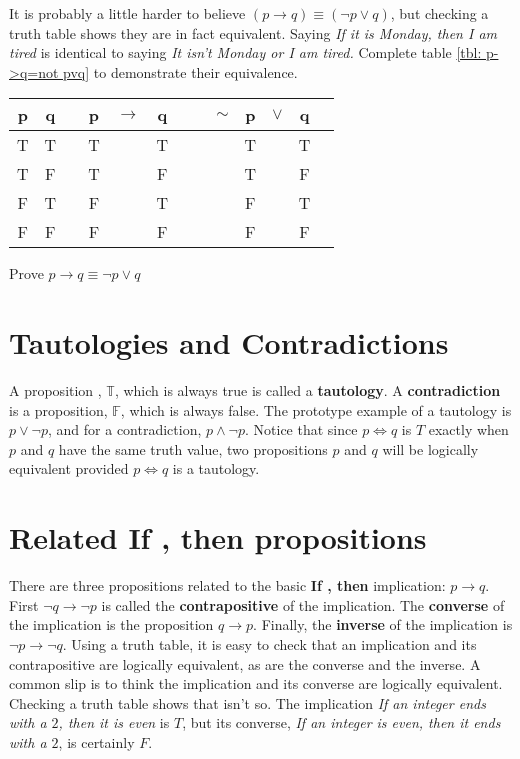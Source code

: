 It is probably a little harder to believe
 $(p\to q)\equiv (\lnot p\lor q)$, but checking a truth table shows they are in fact equivalent.
Saying {\itshape If it is Monday, then I am tired} is identical to saying
{\itshape It isn't Monday or I am tired.} Complete table \ref{tbl: p->q=not pvq} to demonstrate their
equivalence.
\begin{margintable}
\begin{tabular}{@{ }c@{ }@{ }c | c@{ }@{ }c@{ }@{ }c@{ }@{ }c@{ }@{ }c | c@{ }@{ }c@{ }@{ }c@{ }@{ }c@{ }@{ }c@{ }@{ }c}
p & q &  & p & $\rightarrow$ & q &  &  & $\sim$ & p & $\lor$ & q & \\
\hline 
T & T &  & T &  & T &  &  &  & T &  & T & \\
T & F &  & T &  & F &  &  &  & T &  & F & \\
F & T &  & F &  & T &  &  &  & F &  & T & \\
F & F &  & F &  & F &  &  &  & F &  & F & \\
\end{tabular}
\caption{Prove $p\to q \equiv \lnot p\lor q$}
\label{tbl: p->q=not pvq}
\end{margintable}


\section{Tautologies and Contradictions}
A proposition , $\mathbb{T}$, which is always true is called a {\bfseries tautology}. A {\bfseries contradiction} is a 
proposition, $\mathbb{F}$,
which is always false.  The prototype example of a tautology is $p\lor \lnot p$, and for a contradiction,
$p\land \lnot p$.  Notice that since $p\iff q$ is $T$ exactly when $p$ and $q$ have the same
truth value,  two propositions $p$ and $q$ will be logically equivalent provided
 $p\iff q$ is a tautology. 

\section{Related \textbf{If \textellipsis, then \textellipsis} propositions} 
There are three propositions related to the basic \textbf{If \textellipsis, then \textellipsis} implication: $p\to q$. First  
$\lnot q\to \lnot p$  is called the {\bfseries contrapositive}
of the implication. The {\bfseries converse} of the implication is the
proposition $q\to p$. Finally, the {\bfseries inverse} of the implication is  $\lnot p\to \lnot q$. 
Using a truth table, it is easy to check that an implication and its contrapositive are
logically equivalent, as are the converse and the inverse. A common slip is to think
the implication and its converse are logically equivalent. Checking a truth table shows that
isn't so. The implication {\itshape If an integer ends with a $2$, then it is even}
is $T$, but its converse, {\itshape If an integer is even, then it ends with a $2$},
is certainly $F$. 

